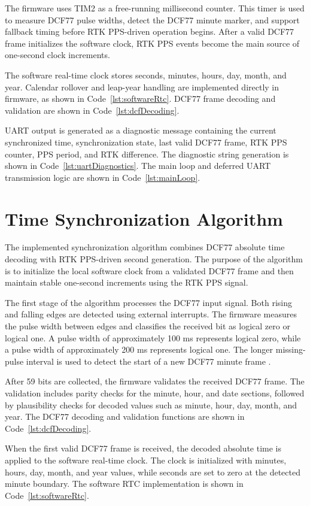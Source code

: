The firmware uses TIM2 as a free-running millisecond counter. This timer is used to measure DCF77 pulse widths, detect the DCF77 minute marker, and support fallback timing before RTK PPS-driven operation begins. After a valid DCF77 frame initializes the software clock, RTK PPS events become the main source of one-second clock increments.

The software real-time clock stores seconds, minutes, hours, day, month, and year. Calendar rollover and leap-year handling are implemented directly in firmware, as shown in Code~\ref{lst:softwareRtc}. DCF77 frame decoding and validation are shown in Code~\ref{lst:dcfDecoding}.

UART output is generated as a diagnostic message containing the current synchronized time, synchronization state, last valid DCF77 frame, RTK PPS counter, PPS period, and RTK difference. The diagnostic string generation is shown in Code~\ref{lst:uartDiagnostics}. The main loop and deferred UART transmission logic are shown in Code~\ref{lst:mainLoop}.

\section{Time Synchronization Algorithm}

The implemented synchronization algorithm combines DCF77 absolute time decoding with RTK PPS-driven second generation. The purpose of the algorithm is to initialize the local software clock from a validated DCF77 frame and then maintain stable one-second increments using the RTK PPS signal.

The first stage of the algorithm processes the DCF77 input signal. Both rising and falling edges are detected using external interrupts. The firmware measures the pulse width between edges and classifies the received bit as logical zero or logical one. A pulse width of approximately 100 ms represents logical zero, while a pulse width of approximately 200 ms represents logical one. The longer missing-pulse interval is used to detect the start of a new DCF77 minute frame \cite{ptbDcf77}.

After 59 bits are collected, the firmware validates the received DCF77 frame. The validation includes parity checks for the minute, hour, and date sections, followed by plausibility checks for decoded values such as minute, hour, day, month, and year. The DCF77 decoding and validation functions are shown in Code~\ref{lst:dcfDecoding}.

When the first valid DCF77 frame is received, the decoded absolute time is applied to the software real-time clock. The clock is initialized with minutes, hours, day, month, and year values, while seconds are set to zero at the detected minute boundary. The software RTC implementation is shown in Code~\ref{lst:softwareRtc}.

